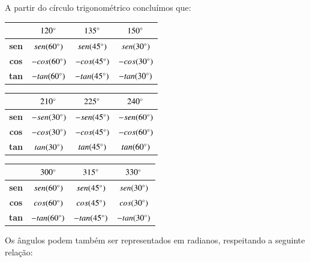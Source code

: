   A partir do círculo trigonométrico concluímos que:
  
  \begin{table}[H]
 \centering
 \begin{tabular}{|c|c|c|c|} \hline
 \rowcolor{cinza}
               &  $120\degree$  & $135\degree$  &  $150\degree$ \\\hline
  \textbf{sen} & $sen(60\degree)$ &$sen(45\degree)$ & $sen(30\degree)$  \\\hline
  \textbf{cos} & $-cos(60\degree)$ &$-cos(45\degree)$ & $-cos(30\degree)$  \\\hline
  \textbf{tan} & $-tan(60\degree)$ &$-tan(45\degree)$ & $-tan(30\degree)$  \\\hline
 \end{tabular}
\end{table}

 \begin{table}[H]
 \centering
 \begin{tabular}{|c|c|c|c|} \hline
 \rowcolor{cinza}
                & $210\degree$ & $225\degree$  & $240\degree$  \\\hline
  \textbf{sen} &  $-sen(30\degree)$ & $-sen(45\degree)$ & $-sen(60\degree)$  \\\hline
  \textbf{cos} &  $-cos(30\degree)$ & $-cos(45\degree)$ & $-cos(60\degree)$  \\\hline
  \textbf{tan} &  $tan(30\degree)$ & $tan(45\degree)$ & $tan(60\degree)$   \\\hline
 \end{tabular}
\end{table}

 \begin{table}[h]
 \centering
 \begin{tabular}{|c|c|c|c|} \hline
 \rowcolor{cinza}
               & $300\degree$ & $315\degree$ & $330\degree$ \\\hline
  \textbf{sen} & $sen(60\degree)$ & $sen(45\degree)$ & $sen(30\degree)$ \\\hline
  \textbf{cos} & $cos(60\degree)$ & $cos(45\degree)$ & $cos(30\degree)$  \\\hline
  \textbf{tan} & $-tan(60\degree)$ & $-tan(45\degree)$ & $-tan(30\degree)$  \\\hline
 \end{tabular}
\end{table}
 
  
  Os ângulos podem também ser representados em radianos, respeitando a seguinte relação:
  
